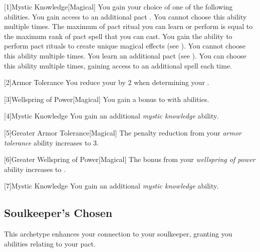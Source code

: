         [1]{Mystic Knowledge}[Magical] You gain your choice of one of the following abilities.
        {
             You gain access to an additional pact .
                You cannot choose this ability multiple times.
             The maximum  of pact ritual you can learn or perform is equal to the maximum rank of pact spell that you can cast.
                You gain the ability to perform pact rituals to create unique magical effects (see ).
                You cannot choose this ability multiple times.
             You learn an additional pact  (see ).
                You can choose this ability multiple times, gaining access to an additional spell each time.
        }

        [2]{Armor Tolerance} You reduce your  by 2 when determining your .

        [3]{Wellspring of Power}[Magical]
        You gain a  bonus to  with  abilities.

        [4]{Mystic Knowledge} You gain an additional \textit{mystic knowledge} ability.

        [5]{Greater Armor Tolerance}[Magical] The penalty reduction from your \textit{armor tolerance} ability increases to 3.

        [6]{Greater Wellspring of Power}[Magical]
        The bonus from your \textit{wellspring of power} ability increases to .

        [7]{Mystic Knowledge} You gain an additional \textit{mystic knowledge} ability.

    \subsection{Soulkeeper's Chosen}
        This archetype enhances your connection to your soulkeeper, granting you abilities relating to your pact.

